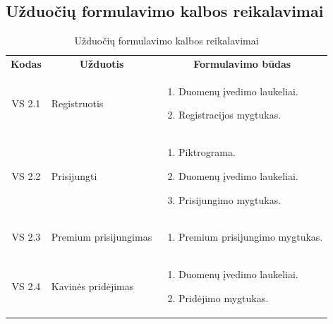 \documentclass{VUMIFPSkursinis}
\begin{document}
\subsection{Užduočių formulavimo kalbos reikalavimai}
\begin{center}

	\begin{longtable}{|p{2cm}|p{}|p{}|}
	\caption{Užduočių formulavimo kalbos reikalavimai}
	\endfirsthead
	\endhead
	\hline
	    \rowcolor{lightgray}
		\multicolumn{3}{|c|}{Užduočių formulavimo kalbos reikalavimai}\\
		
	\hline
		\multicolumn{1}{|c|}{{\bfseries Kodas}}&
		\multicolumn{1}{|c|}{{\bfseries Užduotis}}&
		\multicolumn{1}{|c|}{{\bfseries Formulavimo būdas}}\\		
	\hline
		\multicolumn{1}{|c|}{VS 2.1}& 	
		{Registruotis}&
		\multicolumn{1}{|p{8,6cm}|}{
			\begin{enumerate}
				\item Duomenų įvedimo laukeliai.
				\item Registracijos mygtukas.
			\end{enumerate}}\\
	
	\hline
		\multicolumn{1}{|c|}{VS 2.2}& 	
		{Prisijungti}&
		\multicolumn{1}{|p{8,6cm}|}{
			\begin{enumerate}
				\item Piktrograma. 
				\item Duomenų įvedimo laukeliai.
				\item Prisijungimo  mygtukas.
			\end{enumerate}}\\
	
	\hline
		\multicolumn{1}{|c|}{VS 2.3}& 	
		{Premium prisijungimas}&
		\multicolumn{1}{|p{8,6cm}|}{
			\begin{enumerate}
				\item Premium prisijungimo mygtukas.
			\end{enumerate}}\\
	
	\hline
		\multicolumn{1}{|c|}{VS 2.4}& 	
		{Kavinės pridėjimas}&
		\multicolumn{1}{|p{8,6cm}|}{
			\begin{enumerate}
				\item Duomenų įvedimo laukeliai.
				\item Pridėjimo mygtukas.
			\end{enumerate}}\\
	

\end{longtable}
\end{center}
\end{document}
